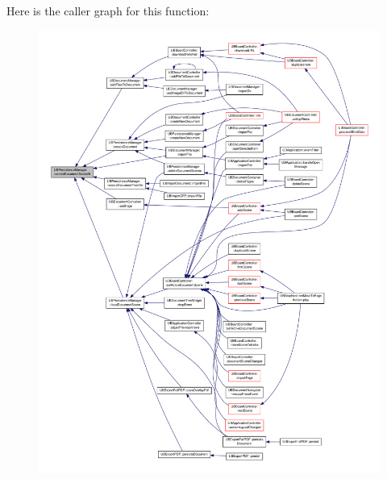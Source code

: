 Here is the caller graph for this function\-:
\nopagebreak
\begin{figure}[H]
\begin{center}
\leavevmode
\includegraphics[width=350pt]{d0/dd5/class_u_b_persistence_manager_a76cf6f2838a93d64153d7eb6e62521ff_icgraph}
\end{center}
\end{figure}


